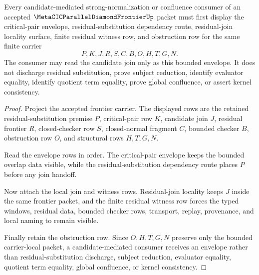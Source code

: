\begin{theorem}
\label{thm:metacic-parallel-diamond-frontier-critical-pair-join-envelope}
Every candidate-mediated strong-normalization or confluence consumer of an accepted $\MetaCICParallelDiamondFrontierUp$ packet must first display the critical-pair envelope, residual-substitution dependency route, residual-join locality surface, finite residual witness row, and obstruction row for the same finite carrier
$$
P,K,J,R,S,C,B,O,H,T,G,N .
$$
The consumer may read the candidate join only as this bounded envelope. It does not discharge residual substitution, prove subject reduction, identify evaluator equality, identify quotient term equality, prove global confluence, or assert kernel consistency.
\end{theorem}
\begin{proof}
Project the accepted frontier carrier. The displayed rows are the retained residual-substitution premise $P$, critical-pair row $K$, candidate join $J$, residual frontier $R$, closed-checker row $S$, closed-normal fragment $C$, bounded checker $B$, obstruction row $O$, and structural rows $H,T,G,N$.

Read the envelope rows in order. The critical-pair envelope keeps the bounded overlap data visible, while the residual-substitution dependency route places $P$ before any join handoff.

Now attach the local join and witness rows. Residual-join locality keeps $J$ inside the same frontier packet, and the finite residual witness row forces the typed windows, residual data, bounded checker rows, transport, replay, provenance, and local naming to remain visible.

Finally retain the obstruction row. Since $O,H,T,G,N$ preserve only the bounded carrier-local packet, a candidate-mediated consumer receives an envelope rather than residual-substitution discharge, subject reduction, evaluator equality, quotient term equality, global confluence, or kernel consistency.
\end{proof}
